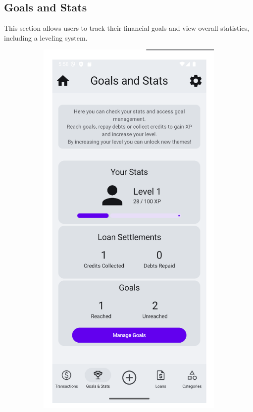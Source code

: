 \documentclass[a4paper,12pt]{article}
\begin{document}
\subsection{Goals and Stats}
This section allows users to track their financial goals and view overall statistics, including a leveling system.

\begin{figure}[H]
    \centering
    \begin{subfigure}[b]{0.23\textwidth}
        \includegraphics[width=\textwidth]{goals_stats.png}

\end{subfigure}
\end{figure}
\end{document}
